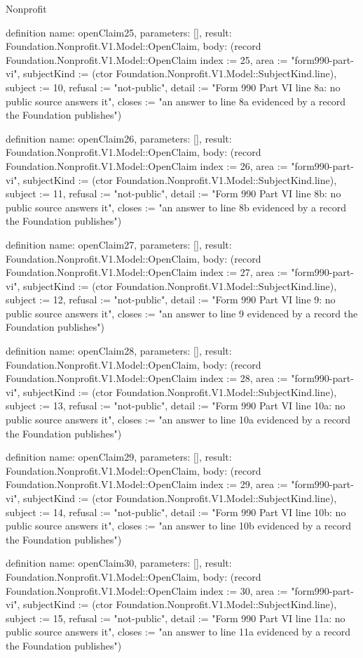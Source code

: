 \begin{lexlean}{Nonprofit}
\begin{semanticmodule}
definition{
  name: openClaim25,
  parameters: [],
  result: Foundation.Nonprofit.V1.Model::OpenClaim,
  body: (record Foundation.Nonprofit.V1.Model::OpenClaim {index := 25, area := "form990-part-vi", subjectKind := (ctor Foundation.Nonprofit.V1.Model::SubjectKind.line), subject := 10, refusal := "not-public", detail := "Form 990 Part VI line 8a: no public source answers it", closes := "an answer to line 8a evidenced by a record the Foundation publishes"})
}

definition{
  name: openClaim26,
  parameters: [],
  result: Foundation.Nonprofit.V1.Model::OpenClaim,
  body: (record Foundation.Nonprofit.V1.Model::OpenClaim {index := 26, area := "form990-part-vi", subjectKind := (ctor Foundation.Nonprofit.V1.Model::SubjectKind.line), subject := 11, refusal := "not-public", detail := "Form 990 Part VI line 8b: no public source answers it", closes := "an answer to line 8b evidenced by a record the Foundation publishes"})
}

definition{
  name: openClaim27,
  parameters: [],
  result: Foundation.Nonprofit.V1.Model::OpenClaim,
  body: (record Foundation.Nonprofit.V1.Model::OpenClaim {index := 27, area := "form990-part-vi", subjectKind := (ctor Foundation.Nonprofit.V1.Model::SubjectKind.line), subject := 12, refusal := "not-public", detail := "Form 990 Part VI line 9: no public source answers it", closes := "an answer to line 9 evidenced by a record the Foundation publishes"})
}

definition{
  name: openClaim28,
  parameters: [],
  result: Foundation.Nonprofit.V1.Model::OpenClaim,
  body: (record Foundation.Nonprofit.V1.Model::OpenClaim {index := 28, area := "form990-part-vi", subjectKind := (ctor Foundation.Nonprofit.V1.Model::SubjectKind.line), subject := 13, refusal := "not-public", detail := "Form 990 Part VI line 10a: no public source answers it", closes := "an answer to line 10a evidenced by a record the Foundation publishes"})
}

definition{
  name: openClaim29,
  parameters: [],
  result: Foundation.Nonprofit.V1.Model::OpenClaim,
  body: (record Foundation.Nonprofit.V1.Model::OpenClaim {index := 29, area := "form990-part-vi", subjectKind := (ctor Foundation.Nonprofit.V1.Model::SubjectKind.line), subject := 14, refusal := "not-public", detail := "Form 990 Part VI line 10b: no public source answers it", closes := "an answer to line 10b evidenced by a record the Foundation publishes"})
}

definition{
  name: openClaim30,
  parameters: [],
  result: Foundation.Nonprofit.V1.Model::OpenClaim,
  body: (record Foundation.Nonprofit.V1.Model::OpenClaim {index := 30, area := "form990-part-vi", subjectKind := (ctor Foundation.Nonprofit.V1.Model::SubjectKind.line), subject := 15, refusal := "not-public", detail := "Form 990 Part VI line 11a: no public source answers it", closes := "an answer to line 11a evidenced by a record the Foundation publishes"})
}


\end{semanticmodule}
\end{lexlean}
